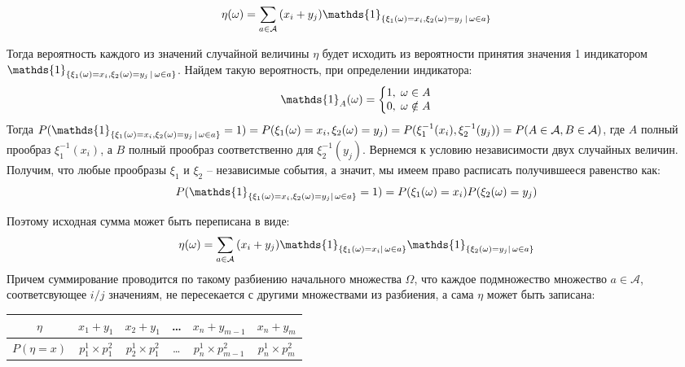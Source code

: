 \documentclass{article}
\makeatletter
\newenvironment{sistema}%
{\left\lbrace\begin{array}{@{}l@{}}}%
{\end{array}\right.}
\makeatother
\begin{document}
    $$\eta(\omega) = \sum_{a \in \mathcal{A}}{(x_i + y_j) \mathds{1}_{\{\xi_1(\omega) = x_i, \xi_2(\omega) = y_j \hspace{0.05cm} | \hspace{0.05cm} \omega \in a\}}}$$

    Тогда вероятность каждого из значений случайной величины $\eta$ будет исходить из вероятности принятия значения 1 индикатором $\mathds{1}_{\{\xi_1(\omega) = x_i, \xi_2(\omega) = y_j \hspace{0.05cm} | \hspace{0.05cm} \omega \in a\}}$. Найдем такую вероятность, при определении индикатора:
    \[
      \mathds{1}_{A}(\omega) =
      \begin{sistema}
        1, \hspace{0.1cm} \omega \in A\\
        0, \hspace{0.1cm} \omega \notin A 
      \end{sistema} 
    \]
    Тогда $P(\mathds{1}_{\{\xi_1(\omega) = x_i, \xi_2(\omega) = y_j \hspace{0.05cm} | \hspace{0.05cm} \omega \in a\}} = 1) =\\ 
    P(\xi_1(\omega) = x_i, \xi_2(\omega) = y_j)= P(\xi_1^{-1}(x_i), \xi_2^{-1}(y_j))=\\ 
    P(A \in \mathcal{A}, B \in \mathcal{A})$, где  $A$ полный прообраз $\xi_1^{-1}(x_i)$, а $B$ полный прообраз соответственно для $\xi_2^{-1}(y_j)$. Вернемся к условию независимости двух случайных величин. Получим, что любые прообразы $\xi_1$ и $\xi_2$ -- независимые события, а значит, мы имеем право расписать получившееся равенство как:
    $$P(\mathds{1}_{\{\xi_1(\omega) = x_i, \xi_2(\omega) = y_j | \hspace{0.05cm} \omega \in a\}} = 1) = P(\xi_1(\omega) = x_i)P(\xi_2(\omega) = y_j)$$

    Поэтому исходная сумма может быть переписана в виде:
    $$\eta(\omega) = \sum_{a \in \mathcal{A}}{(x_i + y_j) \mathds{1}_{\{\xi_1(\omega) = x_i | \hspace{0.05cm} \omega \in a\}} \mathds{1}_{\{\xi_2(\omega) = y_j | \hspace{0.05cm} \omega \in a\}}}$$
    Причем суммирование проводится по такому разбиению начального множества $\Omega$, что каждое подмножество множество $a \in \mathcal{A}$, соответсвующее $i/j$  значениям, не пересекается с другими множествами из разбиения, а сама $\eta$ может быть записана:
    \begin{center}
        \begin{tabular}{ c|c|c|c|c|c } 
             $\eta$ & $x_1 + y_1$ & $x_2 + y_1$ & \ldots & $x_n + y_{m-1}$ & $x_n + y_m$\\
             \hline
             $P(\eta = x)$ & $p^1_1 \times p^2_1$ & $p^1_2 \times p^2_1$ & \ldots & $p^1_n \times p^2_{m-1}$ & $p^1_n \times p^2_m$\\
        \end{tabular}
    \end{center}
\end{document}
